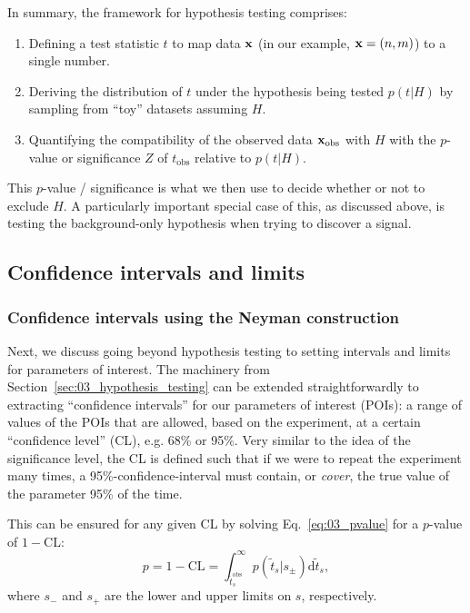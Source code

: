 
In summary, the framework for hypothesis testing comprises:

\begin{enumerate}
    \item Defining a test statistic $t$ to map data $\mathbf{x}$ (in our example, $\mathbf{x} = (n, m)$) to a single number.
    \item Deriving the distribution of $t$ under the hypothesis being tested $p(t|H)$ by sampling from ``toy'' datasets assuming $H$.
    \item Quantifying the compatibility of the observed data $\mathbf{x}_{\mathrm{obs}}$ with $H$ with the $p$-value or significance $Z$ of $t_{\mathrm{obs}}$ relative to $p(t|H)$.
\end{enumerate}

This $p$-value / significance is what we then use to decide whether or not to exclude $H$.
A particularly important special case of this, as discussed above, is testing the background-only hypothesis when trying to discover a signal.

\subsection{Confidence intervals and limits}
\label{sec:03_intervals}

\subsubsection{Confidence intervals using the Neyman construction}

Next, we discuss going beyond hypothesis testing to setting intervals and limits for parameters of interest.
The machinery from Section~\ref{sec:03_hypothesis_testing} can be extended straightforwardly to extracting ``confidence intervals'' for our parameters of interest (POIs): a range of values of the POIs that are allowed, based on the experiment, at a certain ``confidence level'' (CL), e.g. 68\% or 95\%.
Very similar to the idea of the significance level, the CL is defined such that if we were to repeat the experiment many times, a 95\%-confidence-interval must contain, or \textit{cover}, the true value of the parameter 95\% of the time.

This can be ensured for any given CL by solving Eq.~\ref{eq:03_pvalue} for a $p$-value of $1 - \mathrm{CL}$:
\begin{equation}
p = 1 - \mathrm{CL} = \int_{\tilde{t}^{\mathrm{obs}}_s}^{\infty}p(\tilde{t}_s|s_\pm)\mathrm d \tilde{t}_s,
\label{eq:03_cl}
\end{equation}
where $s_-$ and $s_+$ are the lower and upper limits on $s$, respectively.

